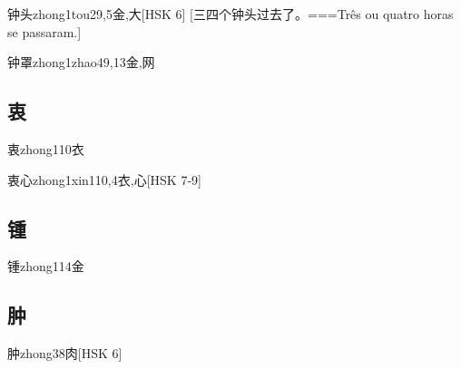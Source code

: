 \begin{EntryWithPhonetic}{钟头}{zhong1tou2}{9,5}{⾦,⼤}[HSK 6]
  [三四个钟头过去了。===Três ou quatro horas se passaram.]
\end{EntryWithPhonetic}

\begin{EntryWithPhonetic}{钟罩}{zhong1zhao4}{9,13}{⾦,⽹}
\end{EntryWithPhonetic}

\subsection*{衷}

\begin{EntryWithPhonetic}{衷}{zhong1}{10}{⾐}
\end{EntryWithPhonetic}

\begin{EntryWithPhonetic}{衷心}{zhong1xin1}{10,4}{⾐,⼼}[HSK 7-9]
\end{EntryWithPhonetic}

\subsection*{锺}

\begin{EntryWithPhonetic}{锺}{zhong1}{14}{⾦}
\end{EntryWithPhonetic}

\subsection*{肿}

\begin{EntryWithPhonetic}{肿}{zhong3}{8}{⾁}[HSK 6]
\end{EntryWithPhonetic}

